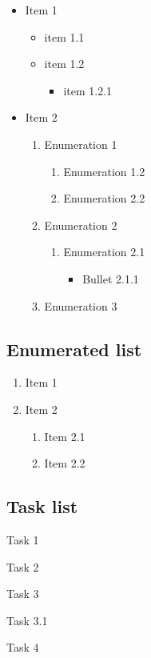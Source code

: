 \documentclass{article}
\begin{document}
\begin{itemize}
\item Item 1
\begin{itemize}
\item item 1.1
\item item 1.2
\begin{itemize}
\item item 1.2.1
\end{itemize}
\end{itemize}
\item Item 2
\begin{enumerate}
\item Enumeration 1
\begin{enumerate}
\item Enumeration 1.2
\item Enumeration 2.2
\end{enumerate}
\item Enumeration 2
\begin{enumerate}
\item Enumeration 2.1
\begin{itemize}
\item Bullet 2.1.1
\end{itemize}
\end{enumerate}
\item Enumeration 3
\end{enumerate}
\end{itemize}


\subsection{Enumerated list}

\begin{enumerate}
\item Item 1
\item Item 2
\begin{enumerate}
\item Item 2.1
\item Item 2.2
\end{enumerate}
\end{enumerate}


\subsection{Task list}

\begin{todolist}
\item Task 1
\item Task 2
\item Task 3
\begin{todolist}
\item Task 3.1
\end{todolist}
\item Task 4
\end{todolist}
\end{document}
